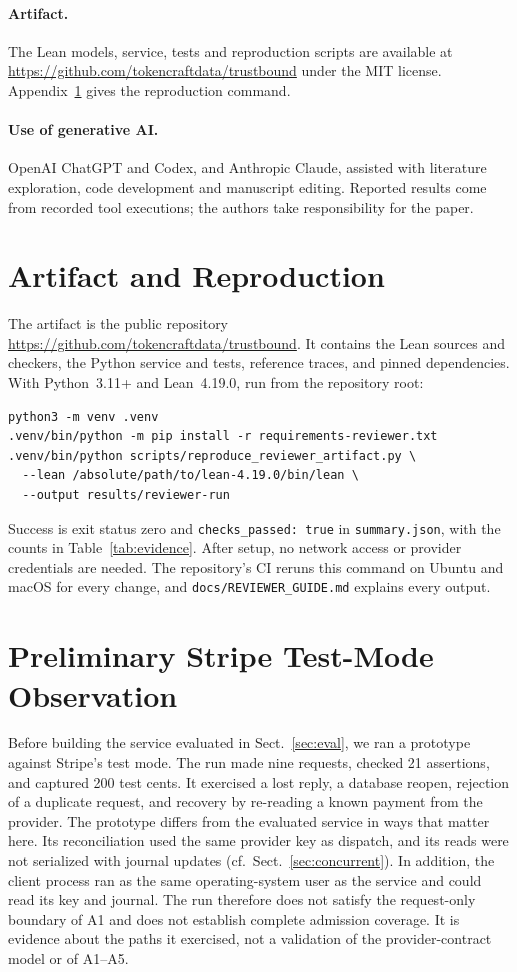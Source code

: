 \documentclass[runningheads]{llncs}
\newcommand{\code}[1]{\texttt{\small #1}}
\begin{document}
\paragraph{Artifact.}
The Lean models, service, tests and reproduction scripts are available at
\url{https://github.com/tokencraftdata/trustbound}
under the MIT license. Appendix~\ref{app:artifact} gives the reproduction
command.

\paragraph{Use of generative AI.}
OpenAI ChatGPT and Codex, and Anthropic Claude, assisted with literature
exploration, code development and manuscript editing. Reported results come
from recorded tool executions; the authors take responsibility for the paper.

\begingroup
\small
\raggedright

\endgroup

\appendix
\section{Artifact and Reproduction}
\label{app:artifact}
The artifact is the public repository
\url{https://github.com/tokencraftdata/trustbound}. It
contains the Lean sources and checkers, the Python service and tests, reference
traces, and pinned dependencies. With Python~3.11+ and Lean~4.19.0, run from the
repository root:
\begin{verbatim}
python3 -m venv .venv
.venv/bin/python -m pip install -r requirements-reviewer.txt
.venv/bin/python scripts/reproduce_reviewer_artifact.py \
  --lean /absolute/path/to/lean-4.19.0/bin/lean \
  --output results/reviewer-run
\end{verbatim}
Success is exit status zero and \code{checks\_passed: true} in
\code{summary.json}, with the counts in Table~\ref{tab:evidence}. After setup,
no network access or provider credentials are needed. The repository's CI
reruns this command on Ubuntu and macOS for every change, and
\code{docs/REVIEWER\_GUIDE.md} explains every output.

\section{Preliminary Stripe Test-Mode Observation}
\label{sec:historical}
Before building the service evaluated in Sect.~\ref{sec:eval}, we ran a
prototype against Stripe's test mode. The run made nine requests, checked 21
assertions, and captured 200 test cents. It exercised a lost reply, a database
reopen, rejection of a duplicate request, and recovery by re-reading a known
payment from the provider. The prototype differs from the evaluated service in
ways that matter here. Its reconciliation used the same provider key as
dispatch, and its reads were not serialized with journal updates
(cf.\ Sect.~\ref{sec:concurrent}). In addition, the client process ran as
the same operating-system user as the service and could read its key and
journal. The run therefore does not satisfy the request-only boundary of A1 and
does not establish complete admission coverage. It is evidence about the paths
it exercised, not a validation of the provider-contract model or of A1--A5.
\end{document}
